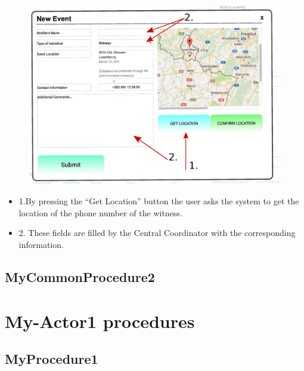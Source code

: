 \begin{minipage}{0.7\textwidth}
\begin{figure}[H]
\includegraphics[width=1.0\textwidth]{GetLocation.eps}
\end{figure}
\end{minipage} \hfill
\begin{minipage}{0.25\textwidth}
\begin{itemize}
\item 1.By pressing the ``Get Location'' button the user asks the system to get the
location of the phone number of the witness.
\item 2. These fields are filled by the Central Coordinator with the corresponding
information.
\end{itemize}
\end{minipage}



 






\subsection{MyCommonProcedure2}


\section{My-Actor1 procedures}

\subsection{MyProcedure1}

